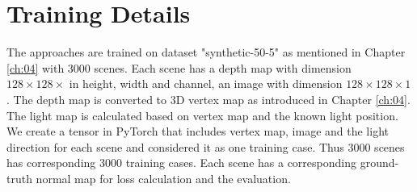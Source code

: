 \documentclass[border=15pt, multi, tikz]{article}
\begin{document}
\section{Training Details}

The approaches are trained on dataset "synthetic-50-5" as mentioned in Chapter \ref{ch:04} with 3000 scenes. Each scene has a depth map with dimension $ 128\times 128 \times $ in height, width and channel, an image with dimension $ 128\times 128 \times 1 $.  The depth map is converted to 3D vertex map as introduced in Chapter \ref{ch:04}. The light map is calculated based on vertex map and the known light position. We create a tensor in PyTorch that includes vertex map, image and the light direction for each scene and considered it as one training case. Thus 3000 scenes has corresponding 3000 training cases. Each scene has a corresponding ground-truth normal map for loss calculation and the evaluation. 
\end{document}
